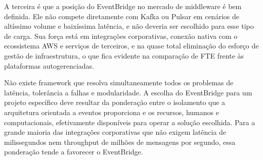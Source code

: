 \documentclass[12pt, a4paper]{article}
\begin{document}
A terceira é que a posição do EventBridge no mercado de middleware é bem definida. Ele não compete diretamente com Kafka ou Pulsar em cenários de altíssimo volume e baixíssima latência, e não deveria ser escolhido para esse tipo de carga. Sua força está em integrações corporativas, conexão nativa com o ecossistema AWS e serviços de terceiros, e na quase total eliminação do esforço de gestão de infraestrutura, o que fica evidente na comparação de FTE frente às plataformas autogerenciadas.

Não existe framework que resolva simultaneamente todos os problemas de latência, tolerância a falhas e modularidade. A escolha do EventBridge para um projeto específico deve resultar da ponderação entre o isolamento que a arquitetura orientada a eventos proporciona e os recursos, humanos e computacionais, efetivamente disponíveis para operar a solução escolhida. Para a grande maioria das integrações corporativas que não exigem latência de milissegundos nem throughput de milhões de mensagens por segundo, essa ponderação tende a favorecer o EventBridge.
\end{document}
